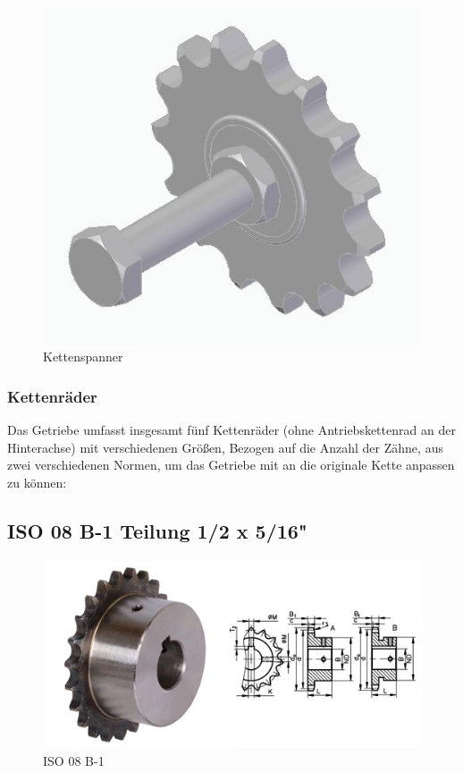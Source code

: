 \begin{figure} [H]
	\begin{center}
		\includegraphics[scale=0.3]{figures/mechanik/14099505.jpg}
			\caption{Kettenspanner}
			\label{fig:Kettenspanner}
	\end{center}
\end{figure}

\newpage

\subsubsection*{Kettenräder}

Das Getriebe umfasst insgesamt fünf Kettenräder (ohne Antriebskettenrad an der Hinterachse) mit verschiedenen Größen, Bezogen auf die Anzahl der Zähne, aus zwei verschiedenen Normen, um das Getriebe mit an die originale Kette anpassen zu können: 

\subsection*{ISO 08 B-1 Teilung 1/2 x 5/16"}

\begin{figure} [H]
	\begin{center}
		\includegraphics[scale=0.7]{figures/mechanik/ISO 08 B-1 .PNG}
			\caption{ISO 08 B-1}
			\label{fig:ISO 08 B-1}
	\end{center}
\end{figure}

